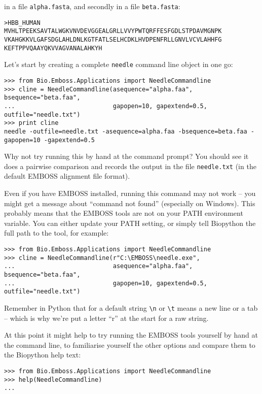 \documentclass{report}
\begin{document}
\noindent in a file \texttt{alpha.fasta}, and secondly in a file \texttt{beta.fasta}:

\begin{verbatim}
>HBB_HUMAN
MVHLTPEEKSAVTALWGKVNVDEVGGEALGRLLVVYPWTQRFFESFGDLSTPDAVMGNPK
VKAHGKKVLGAFSDGLAHLDNLKGTFATLSELHCDKLHVDPENFRLLGNVLVCVLAHHFG
KEFTPPVQAAYQKVVAGVANALAHKYH
\end{verbatim}

Let's start by creating a complete \texttt{needle} command line object in one go:

\begin{verbatim}
>>> from Bio.Emboss.Applications import NeedleCommandline
>>> cline = NeedleCommandline(asequence="alpha.faa", bsequence="beta.faa",
...                           gapopen=10, gapextend=0.5, outfile="needle.txt")
>>> print cline
needle -outfile=needle.txt -asequence=alpha.faa -bsequence=beta.faa -gapopen=10 -gapextend=0.5 
\end{verbatim}

Why not try running this by hand at the command prompt? You should see it does a
pairwise comparison and records the output in the file \texttt{needle.txt} (in the
default EMBOSS alignment file format).

Even if you have EMBOSS installed, running this command may not work -- you
might get a message about ``command not found'' (especially on Windows). This
probably means that the EMBOSS tools are not on your PATH environment
variable. You can either update your PATH setting, or simply tell Biopython
the full path to the tool, for example:

\begin{verbatim}
>>> from Bio.Emboss.Applications import NeedleCommandline
>>> cline = NeedleCommandline(r"C:\EMBOSS\needle.exe",
...                           asequence="alpha.faa", bsequence="beta.faa",
...                           gapopen=10, gapextend=0.5, outfile="needle.txt")
\end{verbatim}

\noindent Remember in Python that for a default string \verb|\n| or \verb|\t| means a
new line or a tab -- which is why we're put a letter ``r'' at the start for a raw string.

At this point it might help to try running the EMBOSS tools yourself by hand at the
command line, to familiarise yourself the other options and compare them to the
Biopython help text:

\begin{verbatim}
>>> from Bio.Emboss.Applications import NeedleCommandline
>>> help(NeedleCommandline)
...
\end{verbatim}
\end{document}
